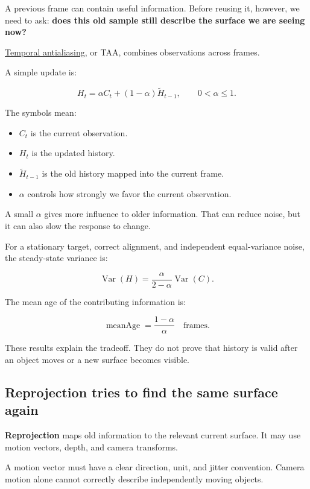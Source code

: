 A previous frame can contain useful information. Before reusing it, however, we need to ask: \textbf{does this old sample still describe the surface we are seeing now?}

\hyperref[appendix-0727340a4428]{Temporal antialiasing}, or TAA, combines observations across frames.

A simple update is:

\[
H_t=\alpha C_t+(1-\alpha)\widetilde H_{t-1},
\qquad 0<\alpha\leq1.
\]

The symbols mean:

\begin{itemize}
\tightlist
\item
  \(C_t\) is the current observation.
\item
  \(H_t\) is the updated history.
\item
  \(\widetilde H_{t-1}\) is the old history mapped into the current frame.
\item
  \(\alpha\) controls how strongly we favor the current observation.
\end{itemize}

A small \(\alpha\) gives more influence to older information. That can reduce noise, but it can also slow the response to change.

For a stationary target, correct alignment, and independent equal-variance noise, the steady-state variance is:

\[
\operatorname{Var}(H)
=\frac{\alpha}{2-\alpha}\operatorname{Var}(C).
\]

The mean age of the contributing information is:

\[
\operatorname{meanAge}=\frac{1-\alpha}{\alpha}
\quad\text{frames}.
\]

These results explain the tradeoff. They do not prove that history is valid after an object moves or a new surface becomes visible.

\subsection{Reprojection tries to find the same surface again}\label{04-visual-computing-ii-ch043-reprojection-tries-to-find-the-same-surface-again}

\textbf{Reprojection} maps old information to the relevant current surface. It may use motion vectors, depth, and camera transforms.

A motion vector must have a clear direction, unit, and jitter convention. Camera motion alone cannot correctly describe independently moving objects.

